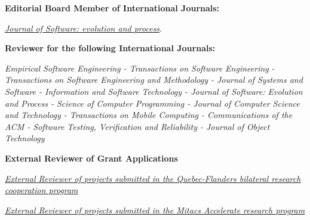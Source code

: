 \documentclass[12pt]{article}
\begin{document}




\textbf{Editorial Board Member of International Journals:}
\begin{innerlist}
   \item \emph{
              \href{http://onlinelibrary.wiley.com/journal/10.1002/(ISSN)2047-7481��}
                   {Journal of Software: evolution and process}}.
\end{innerlist}


\textbf{Reviewer for the following International Journals:}
\begin{innerlist}
\item \emph{Empirical Software Engineering - Transactions on Software Engineering - Transactions on Software Engineering and Methodology - Journal of Systems and Software - Information and Software Technology - Journal of Software: Evolution and Process - Science of Computer Programming - Journal of Computer Science and Technology - Transactions on Mobile Computing - Communications of the ACM - Software Testing, Verification and Reliability - Journal of Object Technology}\\
\end{innerlist} 



\textbf{External Reviewer of Grant Applications}
\begin{innerlist}
   \item \emph{
              \href{http://www.frqnt.gouv.qc.ca/accueil}
                   {External Reviewer of projects submitted in the Quebec-Flanders bilateral research cooperation program}}
\item \emph{
              \href{}
                   {External Reviewer of projects submitted in the Mitacs Accelerate research program}}
                   
\end{innerlist}
\end{document}
